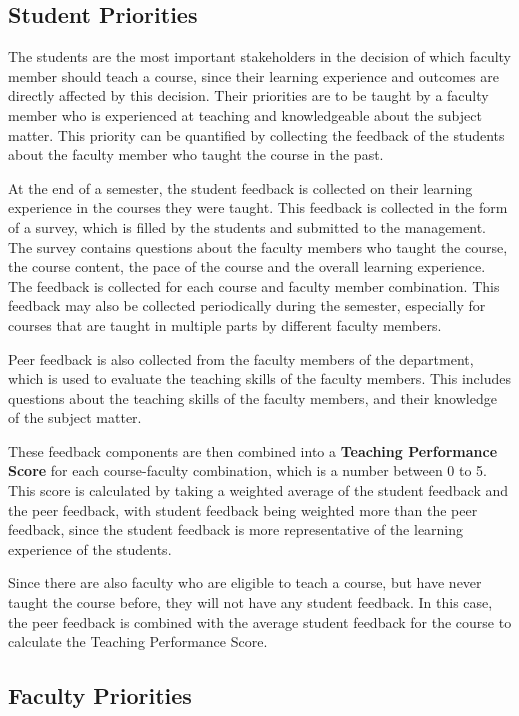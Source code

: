 \subsection{Student Priorities}

The students are the most important stakeholders in the decision of which faculty member should teach a course, since their learning experience and outcomes are directly affected by this decision. Their priorities are to be taught by a faculty member who is experienced at teaching and knowledgeable about the subject matter. This priority can be quantified by collecting the feedback of the students about the faculty member who taught the course in the past.

At the end of a semester, the student feedback is collected on their learning experience in the courses they were taught. This feedback is collected in the form of a survey, which is filled by the students and submitted to the management. The survey contains questions about the faculty members who taught the course, the course content, the pace of the course and the overall learning experience. The feedback is collected for each course and faculty member combination. This feedback may also be collected periodically during the semester, especially for courses that are taught in multiple parts by different faculty members.

Peer feedback is also collected from the faculty members of the department, which is used to evaluate the teaching skills of the faculty members. This includes questions about the teaching skills of the faculty members, and their knowledge of the subject matter.

These feedback components are then combined into a \textbf{Teaching Performance Score} for each course-faculty combination, which is a number between 0 to 5. This score is calculated by taking a weighted average of the student feedback and the peer feedback, with student feedback being weighted more than the peer feedback, since the student feedback is more representative of the learning experience of the students.

Since there are also faculty who are eligible to teach a course, but have never taught the course before, they will not have any student feedback. In this case, the peer feedback is combined with the average student feedback for the course to calculate the Teaching Performance Score.

\subsection{Faculty Priorities}

